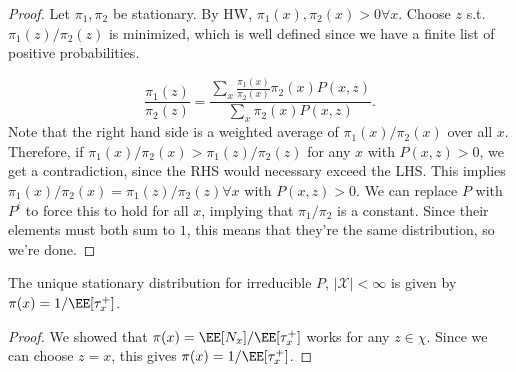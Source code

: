 \begin{proof}
Let $\pi_1, \pi_2$ be stationary. By HW, $\pi_1(x), \pi_2(x)>0\forall x$. Choose $z$ s.t. $\pi_1(z)/\pi_2(z)$ is minimized, which is well defined since we have a finite list of positive probabilities. 

\[\frac{\pi_1(z)}{\pi_2(z)} = \frac{\sum_x \frac{\pi_1(x)}{\pi_2(x)} \pi_2(x)P(x,z)}{\sum_x \pi_2(x) P(x,z)}.\]
Note that the right hand side is a weighted average of $\pi_1(x)/\pi_2(x)$ over all $x$. Therefore, if $\pi_1(x)/\pi_2(x) > \pi_1(z)/\pi_2(z)$ for any $x$ with $P(x,z)>0$, we get a contradiction, since the RHS would necessary exceed the LHS. This implies $\pi_1(x)/\pi_2(x) = \pi_1(z)/\pi_2(z)\forall x$ with $P(x,z)>0$. We can replace $P$ with $P^i$ to force this to hold for all $x$, implying that $\pi_1/\pi_2$ is a constant. Since their elements must both sum to $1$, this means that they're the same distribution, so we're done.   
\end{proof}

\begin{theorem}
\corlabel

The unique stationary distribution for irreducible $P$, $\vert \mathcal{X}\vert < \infty$ is given by $\pi(x) = 1/\EE[\tau_x^+]$.
\end{theorem}

\begin{proof}
We showed that $\pi(x) = \EE[N_x]/\EE[\tau_x^+]$ works for any $z\in \mathcal{\chi}$. Since we can choose $z=x$, this gives $\pi(x) = 1/\EE[\tau_x^+]$. 
\end{proof}